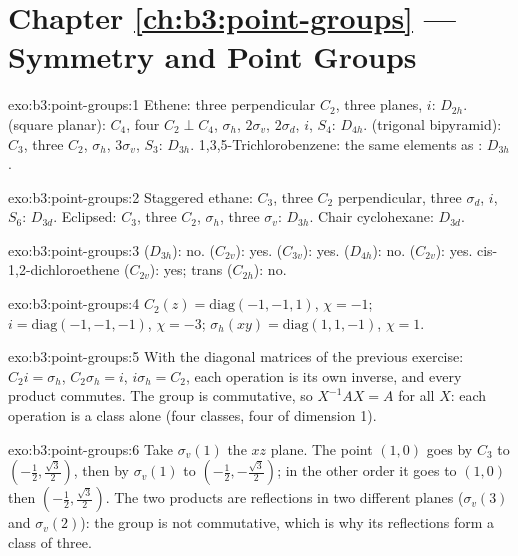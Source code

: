 \section*{Chapter \ref{ch:b3:point-groups} --- Symmetry and Point Groups}

\begin{solution}{exo:b3:point-groups:1}
Ethene: three perpendicular $C_2$, three planes, $i$: $D_{2h}$.  (square
planar): $C_4$, four $C_2 \perp C_4$, $\sigma_h$, $2\sigma_v$, $2\sigma_d$, $i$, $S_4$:
$D_{4h}$.  (trigonal bipyramid): $C_3$, three $C_2$, $\sigma_h$, $3\sigma_v$,
$S_3$: $D_{3h}$. 1,3,5-Trichlorobenzene: the same elements as : $D_{3h}$.
\end{solution}

\begin{solution}{exo:b3:point-groups:2}
Staggered ethane: $C_3$, three $C_2$ perpendicular, three $\sigma_d$, $i$, $S_6$:
$D_{3d}$. Eclipsed: $C_3$, three $C_2$, $\sigma_h$, three $\sigma_v$: $D_{3h}$.
Chair cyclohexane: $D_{3d}$.
\end{solution}

\begin{solution}{exo:b3:point-groups:3}
 ($D_{3h}$): no.  ($C_{2v}$): yes.  ($C_{3v}$): yes.
 ($D_{4h}$): no.  ($C_{2v}$): yes. cis-1,2-dichloroethene
($C_{2v}$): yes; trans ($C_{2h}$): no.
\end{solution}

\begin{solution}{exo:b3:point-groups:4}
$C_2(z) = \mathrm{diag}(-1,-1,1)$, $\chi = -1$; $i = \mathrm{diag}(-1,-1,-1)$,
$\chi = -3$; $\sigma_h(xy) = \mathrm{diag}(1,1,-1)$, $\chi = 1$.
\end{solution}

\begin{solution}{exo:b3:point-groups:5}
With the diagonal matrices of the previous exercise: $C_2i = \sigma_h$, $C_2\sigma_h =
i$, $i\sigma_h = C_2$, each operation is its own inverse, and every product
commutes. The group is commutative, so $X^{-1}AX = A$ for all $X$: each
operation is a class alone (four classes, four 
of dimension 1).
\end{solution}

\begin{solution}{exo:b3:point-groups:6}
Take $\sigma_v(1)$ the $xz$ plane. The point $(1,0)$ goes by $C_3$ to $(-\frac12,
\frac{\sqrt3}2)$, then by $\sigma_v(1)$ to $(-\frac12,-\frac{\sqrt3}2)$; in the other
order it goes to $(1,0)$ then $(-\frac12,\frac{\sqrt3}2)$. The two products are
reflections in two different planes ($\sigma_v(3)$ and $\sigma_v(2)$): the group is
not commutative, which is why its reflections form a class of three.
\end{solution}

